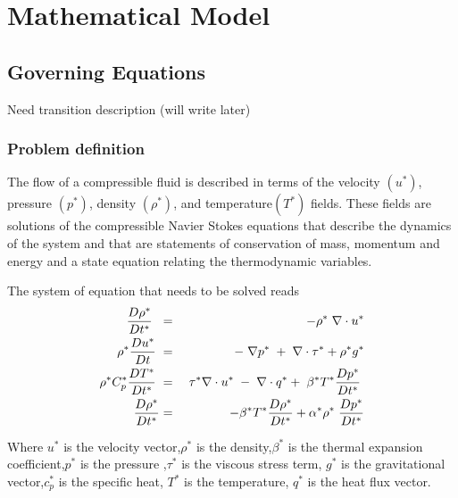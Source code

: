 \chapter{Mathematical Model}
\section{Governing Equations}
Need transition description (will write later)
\subsection{Problem definition}
The flow of a compressible fluid is described in terms of the velocity $(u^*)$, pressure $(p^*)$, density $(\rho^*)$, and temperature$(T^*)$ fields. These fields are solutions of the compressible Navier Stokes equations that describe the dynamics of the system
and that are statements of conservation of mass, momentum and energy and a state equation relating the thermodynamic variables.  

The system of equation that needs to be solved reads
\begin{eqnarray}
\frac{D \rho^*}{D t^*}\hspace{1mm} \hspace{1mm} &=& - \rho^* \hspace{1mm}\nabla \cdot u^* \\
\rho^* \frac{D u^*}{D t} \hspace{1mm} &=& -\hspace{1mm}\nabla p^*\hspace{1mm}+\hspace{1mm}\nabla \cdot \tau^* + \rho^* g^* \\
\rho^* C_p^* \frac{D T^*}{D t^*} \hspace{1mm}&=&\hspace{1mm} \tau^* \nabla \cdot u^* \hspace{1mm}- \hspace{1mm}\nabla \cdot q^* + \hspace{1mm} \beta^* T^* \frac{D p^*}{D t^*}\hspace{1mm}\\
\frac{D \rho^*}{D t^*} &=& \hspace{1mm} - \beta^* T^* \frac{D \rho^*}{D t^*} + \alpha^* \rho^* \hspace{1mm}\frac{D p^*}{D t^*}
\end{eqnarray}

Where $u^*$ is the velocity vector,$\rho^*$ is the density,$\beta^*$ is the thermal expansion coefficient,$p^*$ is the pressure ,$\tau^*$ is the viscous stress term, $g^*$ is the gravitational vector,$c_p^*$ is the specific heat, $T^*$ is the temperature, $q^*$ is the heat flux vector. 

